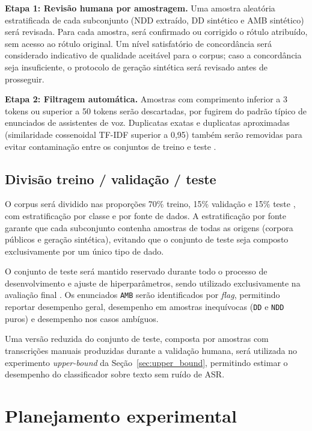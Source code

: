 \documentclass[
    12pt,                %
    openright,           %
    oneside,             %
    a4paper,             %
    english,             %
    brazil               %
]{abntex2}
\begin{document}
\textbf{Etapa 1: Revisão humana por amostragem.}
Uma amostra aleatória estratificada de cada subconjunto (NDD extraído, DD sintético e AMB sintético) será revisada. Para cada amostra, será confirmado ou corrigido o rótulo atribuído, sem acesso ao rótulo original. Um nível satisfatório de concordância será considerado indicativo de qualidade aceitável para o corpus; caso a concordância seja insuficiente, o protocolo de geração sintética será revisado antes de prosseguir.

\textbf{Etapa 2: Filtragem automática.}
Amostras com comprimento inferior a 3 tokens ou superior a 50 tokens serão descartadas, por fugirem do padrão típico de enunciados de assistentes de voz. Duplicatas exatas e duplicatas aproximadas (similaridade cossenoidal TF-IDF superior a 0,95) também serão removidas para evitar contaminação entre os conjuntos de treino e teste \cite{Manning2008}.

\subsection{Divisão treino / validação / teste}
\label{sec:divisao}

O corpus será dividido nas proporções 70\% treino, 15\% validação e 15\% teste \cite{Manning2008}, com estratificação por classe e por fonte de dados. A estratificação por fonte garante que cada subconjunto contenha amostras de todas as origens (corpora públicos e geração sintética), evitando que o conjunto de teste seja composto exclusivamente por um único tipo de dado.

O conjunto de teste será mantido reservado durante todo o processo de desenvolvimento e ajuste de hiperparâmetros, sendo utilizado exclusivamente na avaliação final \cite{Wazlawick2020}. Os enunciados \texttt{AMB} serão identificados por \textit{flag}, permitindo reportar desempenho geral, desempenho em amostras inequívocas (\texttt{DD} e \texttt{NDD} puros) e desempenho nos casos ambíguos.

Uma versão reduzida do conjunto de teste, composta por amostras com transcrições manuais produzidas durante a validação humana, será utilizada no experimento \textit{upper-bound} da Seção~\ref{sec:upper_bound}, permitindo estimar o desempenho do classificador sobre texto sem ruído de ASR.

\section{Planejamento experimental}
\label{sec:planejamento}
\end{document}
